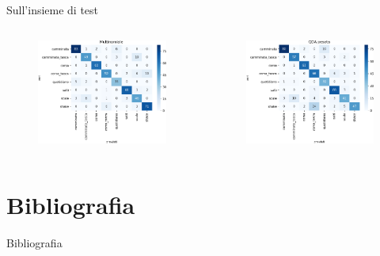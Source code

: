 \documentclass{beamer}
\begin{document}
\begin{frame}{Sull'insieme di test}
\begin{columns}[T] %
\begin{column}{.5\textwidth}
\begin{figure}[H]
\includegraphics[width=\textwidth]{../figure/confusionMatrix-Mn-test.png}
\end{figure}
\end{column}%
\hfill%
\begin{column}{.5\textwidth}
\begin{figure}[H]
\includegraphics[width=\textwidth]{../figure/confusionMatrix-QDA-penalizzata-test.png}
\end{figure}
\end{column}%
\end{columns}
\end{frame}

\section{Bibliografia}
\begin{frame}{Bibliografia}
\printbibliography
\end{frame}
\end{document}
